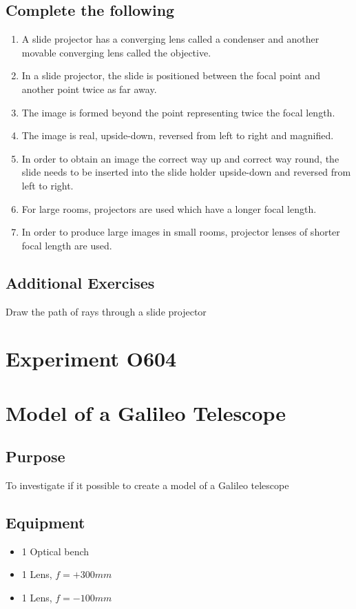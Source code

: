 \documentclass[12pt]{article}
\begin{document}
\subsection*{Complete the following}
\begin{enumerate}
    \item A slide projector has a converging lens called a condenser and another movable converging lens called the objective. 
    \item In a slide projector, the slide is positioned between the focal point and another point twice as far away.
    \item The image is formed beyond the point representing twice the focal length.
    \item The image is real, upside-down, reversed from left to right and magnified. 
    \item In order to obtain an image the correct way up and correct way round, the slide needs to be inserted into the slide holder upside-down and reversed from left to right. 
    \item For large rooms, projectors are used which have a longer focal length.
    \item In order to produce large images in small rooms, projector lenses of shorter focal length are used. 
\end{enumerate}

\subsection*{Additional Exercises}
Draw the path of rays through a slide projector

\newpage
\section*{Experiment O604}

\section*{Model of a Galileo Telescope}

\subsection*{Purpose}
To investigate if it possible to create a model of a Galileo telescope

\subsection*{Equipment}
\begin{itemize}
    \item 1 Optical bench
    \item 1 Lens, $f=+300 mm$
    \item 1 Lens, $f=-100 mm$
\end{itemize}
\end{document}
